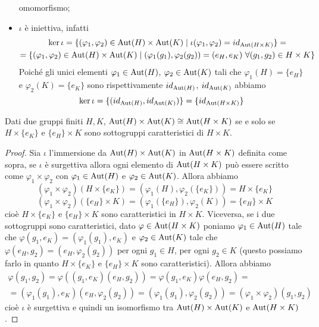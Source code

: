 \documentclass[11pt]{scrartcl}
\begin{document}
\begin{itemize}
    omomorfismo;
    \item$\iota$ è iniettiva, infatti \begin{multline*}
        \ker \iota = \{(\varphi_1, \varphi_2) \in \operatorname{Aut}(H)\times \operatorname{Aut}(K) \mid
        \iota(\varphi_1, \varphi_2) = id_{\operatorname{Aut}(H\times K)}\} = \\
        = \{(\varphi_1, \varphi_2) \in \operatorname{Aut}(H)\times \operatorname{Aut}(K)\mid 
        (\varphi_1(g_1), \varphi_2(g_2)) = (e_H, e_K)~\forall 
        (g_1, g_2) \in H\times K\}
    \end{multline*} Poiché gli unici elementi $\varphi_1 \in \operatorname{Aut}(H)$,
    $\varphi_2 \in \operatorname{Aut}(K)$ tali che $\varphi_1(H) = \{e_H\}$ e $\varphi_2(K) = \{e_K\}$
    sono rispettivamente $id_{\operatorname{Aut}(H)}$, $id_{\operatorname{Aut}(K)}$ abbiamo \[
        \ker\iota = \{(id_{\operatorname{Aut}(H)}, id_{\operatorname{Aut}(K)})\} = \{id_{\operatorname{Aut}(H \times K)}\}
    \] 

\end{itemize}

\begin{proposition}
    Dati due gruppi finiti $H, K$, $\operatorname{Aut}(H)\times \operatorname{Aut}(K)\cong \operatorname{Aut}(H\times K)$
    se e solo se $H\times \{e_K\}$ e $\{e_H\}\times K$ sono sottogruppi 
    caratteristici di $H\times K$.
\end{proposition}

\begin{proof}
    Sia $\iota$ l'immersione da $\operatorname{Aut}(H)\times \operatorname{Aut}(K)$ in $\operatorname{Aut}(H\times K)$ 
    definita come sopra, se $\iota$ è surgettiva allora ogni elemento di 
    $\operatorname{Aut}(H\times K)$ può essere scritto come $\varphi_1\times\varphi_2$ con
    $\varphi_1 \in \operatorname{Aut}(H)$ e $\varphi_2 \in \operatorname{Aut}(K)$. Allora abbiamo 
    \[
        (\varphi_1\times\varphi_2)(H\times\{e_K\}) = 
        (\varphi_1(H), \varphi_2(\{e_K\})) = H\times\{e_K\}
    \]
    \[
        (\varphi_1\times \varphi_2)(\{e_H\}\times K) = 
        (\varphi_1(\{e_H\}), \varphi_2(K)) = \{e_H\}\times K
    \]cioè $H\times\{e_K\}$ e $\{e_H\}\times K$ sono caratteristici in
    $H\times K$. Viceversa, se i due sottogruppi sono caratteristici, dato
    $\varphi \in \operatorname{Aut}(H\times K)$ poniamo $\varphi_1 \in \operatorname{Aut}(H)$ tale che 
    $\varphi(g_1, e_K) = (\varphi_1(g_1), e_K)$ e $\varphi_2 \in \operatorname{Aut}(K)$ 
    tale che $\varphi(e_H, g_2) = (e_H, \varphi_2(g_2))$ per ogni $g_1 \in H$,
    per ogni $g_2 \in K$ (questo possiamo farlo in quanto $H\times\{e_K\}$ 
    e $\{e_H\}\times K$ sono caratteristici). Allora abbiamo 
    \begin{multline*}
        \varphi(g_1, g_2) = \varphi((g_1, e_K)(e_H, g_2)) = 
        \varphi(g_1, e_K)\varphi(e_H, g_2) = \\
        = (\varphi_1(g_1), e_K)(e_H, \varphi_2(g_2)) = 
        (\varphi_1(g_1), \varphi_2(g_2)) = (\varphi_1\times\varphi_2)(g_1, g_2)
    \end{multline*}cioè $\iota$ è surgettiva e quindi un isomorfismo tra
    $\operatorname{Aut}(H)\times \operatorname{Aut}(K)$ e $\operatorname{Aut}(H\times K)$.
\end{proof}
\end{document}
